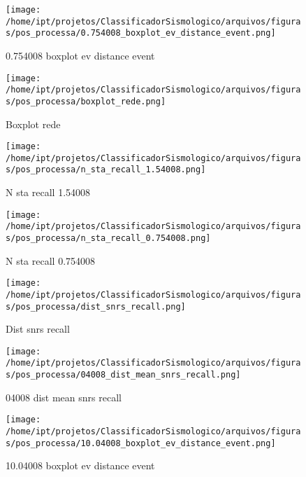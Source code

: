     \begin{figure}[H]
        \centering
        \texttt{[image: /home/ipt/projetos/ClassificadorSismologico/arquivos/figuras/pos\_processa/0.754008\_boxplot\_ev\_distance\_event.png]}
        \caption{0.754008 boxplot ev distance event}
        \label{fig:0.754008_boxplot_ev_distance_event}
    \end{figure}
                

    \begin{figure}[H]
        \centering
        \texttt{[image: /home/ipt/projetos/ClassificadorSismologico/arquivos/figuras/pos\_processa/boxplot\_rede.png]}
        \caption{Boxplot rede}
        \label{fig:boxplot_rede}
    \end{figure}
                

    \begin{figure}[H]
        \centering
        \texttt{[image: /home/ipt/projetos/ClassificadorSismologico/arquivos/figuras/pos\_processa/n\_sta\_recall\_1.54008.png]}
        \caption{N sta recall 1.54008}
        \label{fig:n_sta_recall_1.54008}
    \end{figure}
                

    \begin{figure}[H]
        \centering
        \texttt{[image: /home/ipt/projetos/ClassificadorSismologico/arquivos/figuras/pos\_processa/n\_sta\_recall\_0.754008.png]}
        \caption{N sta recall 0.754008}
        \label{fig:n_sta_recall_0.754008}
    \end{figure}
                

    \begin{figure}[H]
        \centering
        \texttt{[image: /home/ipt/projetos/ClassificadorSismologico/arquivos/figuras/pos\_processa/dist\_snrs\_recall.png]}
        \caption{Dist snrs recall}
        \label{fig:dist_snrs_recall}
    \end{figure}
                

    \begin{figure}[H]
        \centering
        \texttt{[image: /home/ipt/projetos/ClassificadorSismologico/arquivos/figuras/pos\_processa/04008\_dist\_mean\_snrs\_recall.png]}
        \caption{04008 dist mean snrs recall}
        \label{fig:04008_dist_mean_snrs_recall}
    \end{figure}
                

    \begin{figure}[H]
        \centering
        \texttt{[image: /home/ipt/projetos/ClassificadorSismologico/arquivos/figuras/pos\_processa/10.04008\_boxplot\_ev\_distance\_event.png]}
        \caption{10.04008 boxplot ev distance event}
        \label{fig:10.04008_boxplot_ev_distance_event}
    \end{figure}
                

